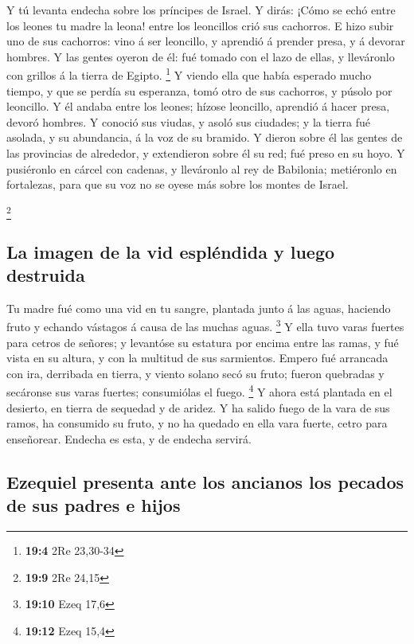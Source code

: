  Y tú levanta endecha sobre los príncipes de Israel.
 Y dirás: ¡Cómo se echó entre los leones tu madre la
leona! entre los leoncillos crió sus cachorros.  E hizo
subir uno de sus cachorros: vino á ser leoncillo, y aprendió á prender
presa, y á devorar hombres.  Y las gentes oyeron de él:
fué tomado con el lazo de ellas, y lleváronlo con grillos á la tierra de
Egipto. \footnote{\textbf{19:4} 2Re 23,30-34}  Y viendo
ella que había esperado mucho tiempo, y que se perdía su esperanza, tomó
otro de sus cachorros, y púsolo por leoncillo.  Y él
andaba entre los leones; hízose leoncillo, aprendió á hacer presa,
devoró hombres.  Y conoció sus viudas, y asoló sus
ciudades; y la tierra fué asolada, y su abundancia, á la voz de su
bramido.  Y dieron sobre él las gentes de las provincias
de alrededor, y extendieron sobre él su red; fué preso en su hoyo.
 Y pusiéronlo en cárcel con cadenas, y lleváronlo al rey
de Babilonia; metiéronlo en fortalezas, para que su voz no se oyese más
sobre los montes de Israel.

\footnote{\textbf{19:9} 2Re 24,15}

\hypertarget{la-imagen-de-la-vid-espluxe9ndida-y-luego-destruida}{%
\subsection{La imagen de la vid espléndida y luego
destruida}\label{la-imagen-de-la-vid-espluxe9ndida-y-luego-destruida}}

 Tu madre fué como una vid en tu sangre, plantada junto á
las aguas, haciendo fruto y echando vástagos á causa de las muchas
aguas. \footnote{\textbf{19:10} Ezeq 17,6}  Y ella tuvo
varas fuertes para cetros de señores; y levantóse su estatura por encima
entre las ramas, y fué vista en su altura, y con la multitud de sus
sarmientos.  Empero fué arrancada con ira, derribada en
tierra, y viento solano secó su fruto; fueron quebradas y secáronse sus
varas fuertes; consumiólas el fuego. \footnote{\textbf{19:12} Ezeq 15,4}
 Y ahora está plantada en el desierto, en tierra de
sequedad y de aridez.  Y ha salido fuego de la vara de
sus ramos, ha consumido su fruto, y no ha quedado en ella vara fuerte,
cetro para enseñorear. Endecha es esta, y de endecha servirá.

\hypertarget{ezequiel-presenta-ante-los-ancianos-los-pecados-de-sus-padres-e-hijos}{%
\subsection{Ezequiel presenta ante los ancianos los pecados de sus
padres e
hijos}\label{ezequiel-presenta-ante-los-ancianos-los-pecados-de-sus-padres-e-hijos}}

